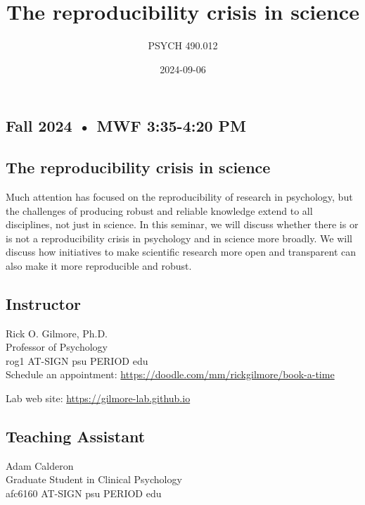 \documentclass[
  letterpaper,
  DIV=11,
  numbers=noendperiod]{scrartcl}
\title{The reproducibility crisis in science}
\subtitle{PSYCH 490.012}
\author{}
\date{2024-09-06}
\begin{document}
\maketitle


\subsection{Fall 2024 • MWF 3:35-4:20
PM}\label{fall-2024-mwf-335-420-pm}

\subsection*{The reproducibility crisis in
science}\label{the-reproducibility-crisis-in-science}

Much attention has focused on the reproducibility of research in
psychology, but the challenges of producing robust and reliable
knowledge extend to all disciplines, not just in science. In this
seminar, we will discuss whether there is or is not a reproducibility
crisis in psychology and in science more broadly. We will discuss how
initiatives to make scientific research more open and transparent can
also make it more reproducible and robust.

\subsection*{Instructor}\label{instructor}

Rick O. Gilmore, Ph.D.~\\
Professor of Psychology\\
rog1 AT-SIGN psu PERIOD edu\\

Schedule an appointment:
\url{https://doodle.com/mm/rickgilmore/book-a-time}

Lab web site: \url{https://gilmore-lab.github.io}

\subsection*{Teaching Assistant}\label{teaching-assistant}

Adam Calderon\\
Graduate Student in Clinical Psychology\\
afc6160 AT-SIGN psu PERIOD edu
\end{document}
